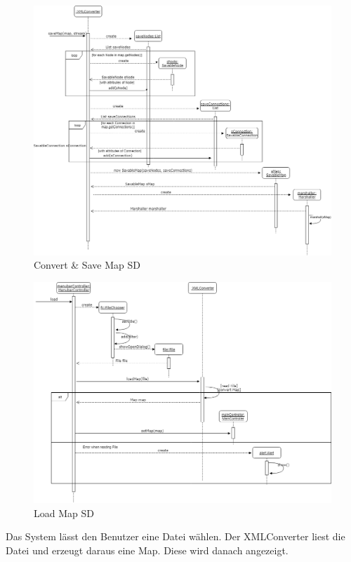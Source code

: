 \begin{figure}[H]
	\centering
		\includegraphics[scale=0.5]{images/saveConvertSD.png}
	\caption{Convert \& Save Map SD}
	\label{fig:saveConvert_SD}
\end{figure}

\begin{figure}[H]
	\centering
		\includegraphics[scale=0.4]{images/loadmapSD.png}
	\caption{Load Map SD}
	\label{fig:loadmap_SD}
\end{figure}
Das System lässt den Benutzer eine Datei wählen. Der XMLConverter liest die Datei und erzeugt daraus eine Map. Diese wird danach angezeigt.

